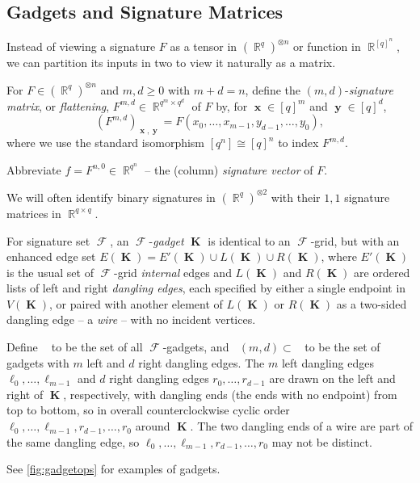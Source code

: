 \documentclass{article}
\DeclareMathOperator{\rr}{\mathbb{R}}
\DeclareMathOperator{\vk}{\mathbf{K}}
\DeclareMathOperator{\vx}{\mathbf{x}}
\DeclareMathOperator{\vy}{\mathbf{y}}
\DeclareMathOperator{\fc}{\mathcal{F}}
\DeclareMathOperator{\gk}{\mathfrak{G}_{\mathcal{F}}}
\begin{document}
\subsection{Gadgets and Signature Matrices}
Instead of viewing a signature $F$ as a tensor in $(\rr^q)^{\otimes n}$ or function in $\rr^{[q]^n}$,
we can partition its inputs in two to view it naturally as a matrix.
\begin{definition}[$F^{m,d},f$]
    \label{def:sig_matrix}
    For $F \in (\rr^q)^{\otimes n}$ and $m,d \geq 0$ with $m+d=n$, define the 
    $(m,d)$-\emph{signature matrix}, or \emph{flattening}, $F^{m,d} \in \rr^{q^m\times q^d}$ of $F$
    by, for $\vx \in [q]^m$ and $\vy \in [q]^d$,
    \[
        (F^{m,d})_{\vx,\vy} = F(x_0,\ldots,x_{m-1},y_{d-1},\ldots,y_0),
    \]
    where we use the standard isomorphism $[q^n] \cong [q]^n$ to index $F^{m,d}$.

    Abbreviate $f = F^{n,0} \in \rr^{q^n}$ -- the (column) \emph{signature vector} of $F$.
\end{definition}
We will often identify binary signatures in $(\rr^q)^{\otimes 2}$
with their $1,1$ signature matrices in $\rr^{q \times q}$.
\begin{definition}[Gadget, $\gk,\gk(m,d)$]
    For signature set $\fc$, an $\fc$-\emph{gadget} $\vk$ is identical to an $\fc$-grid,
    but with an enhanced edge set $E(\vk) = E'(\vk) \cup L(\vk) \cup R(\vk)$, 
    where $E'(\vk)$ is the
    usual set of $\fc$-grid \emph{internal} edges and $L(\vk)$ and $R(\vk)$ are ordered
    lists of left and right \emph{dangling edges}, each specified by either a single endpoint 
    in $V(\vk)$, or paired with another element of $L(\vk)$ or $R(\vk)$ as
    a two-sided dangling edge -- a \emph{wire} -- with no incident vertices. 

    Define $\gk$ to be the set of all $\fc$-gadgets, and $\gk(m,d) \subset \gk$ to be the set 
    of gadgets with $m$ left and $d$ right dangling edges. The $m$ left dangling edges
    $\ell_0,\ldots,\ell_{m-1}$ and $d$ right dangling edges $r_{0}, \ldots, r_{d-1}$ 
    are drawn on the left and right of $\vk$, respectively, with dangling ends (the ends
    with no endpoint) from top to bottom, so in overall counterclockwise cyclic order
    $\ell_0, \ldots, \ell_{m-1}, r_{d-1}, \ldots, r_0$ around $\vk$.
    The two dangling ends of a wire are part of the same dangling edge, so
    $\ell_0, \ldots, \ell_{m-1}, r_{d-1}, \ldots, r_0$ may not be distinct.
\end{definition}
See \autoref{fig:gadgetops} for examples of gadgets.
\end{document}
